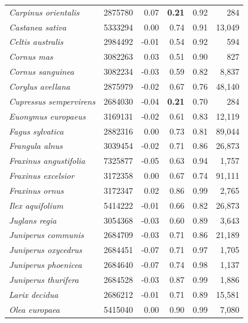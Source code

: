 \documentclass[fleqn,10pt,lineno]{wlpeerj} %
\begin{document}
\begin{center}
\begin{longtable}{lrrrrr}
\emph{Carpinus orientalis}               & 2875780 & 0.07  & \textbf{0.21} & 0.92 & 284     \\
\emph{Castanea sativa}                   & 5333294 & 0.00  & 0.74 & 0.91 & 13,049  \\
\emph{Celtis australis}                  & 2984492 & -0.01 & 0.54 & 0.92 & 594     \\
\emph{Cornus mas}                        & 3082263 & 0.03  & 0.51 & 0.90 & 827     \\
\emph{Cornus sanguinea}                  & 3082234 & -0.03 & 0.59 & 0.82 & 8,837   \\
\emph{Corylus avellana}                  & 2875979 & -0.02 & 0.67 & 0.76 & 48,140  \\
\emph{Cupressus sempervirens}            & 2684030 & -0.04 & \textbf{0.21} & 0.70 & 284     \\
\emph{Euonymus europaeus}                & 3169131 & -0.02 & 0.61 & 0.83 & 12,119  \\
\emph{Fagus sylvatica}                   & 2882316 & 0.00  & 0.73 & 0.81 & 89,044  \\
\emph{Frangula alnus}                    & 3039454 & -0.02 & 0.71 & 0.86 & 26,873  \\
\emph{Fraxinus angustifolia}             & 7325877 & -0.05 & 0.63 & 0.94 & 1,757   \\
\emph{Fraxinus excelsior}                & 3172358 & 0.00  & 0.67 & 0.74 & 91,111  \\
\emph{Fraxinus ornus}                    & 3172347 & 0.02  & 0.86 & 0.99 & 2,765   \\
\emph{Ilex aquifolium}                   & 5414222 & -0.01 & 0.66 & 0.82 & 26,873  \\
\emph{Juglans regia}                     & 3054368 & -0.03 & 0.60 & 0.89 & 3,643   \\
\emph{Juniperus communis}                & 2684709 & -0.03 & 0.71 & 0.86 & 21,189  \\
\emph{Juniperus oxycedrus}               & 2684451 & -0.07 & 0.71 & 0.97 & 1,705   \\
\emph{Juniperus phoenicea}               & 2684640 & -0.07 & 0.74 & 0.98 & 1,137   \\
\emph{Juniperus thurifera}               & 2684528 & -0.03 & 0.87 & 0.99 & 1,886   \\
\emph{Larix decidua}                     & 2686212 & -0.01 & 0.71 & 0.89 & 15,581  \\
\emph{Olea europaea}                     & 5415040 & 0.00  & 0.90 & 0.99 & 7,080   \\

\end{longtable}
\end{center}
\end{document}
